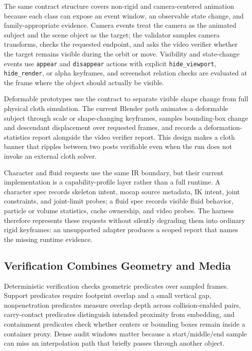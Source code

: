 \documentclass{article}
\newcommand{\code}[1]{\texttt{#1}}
\begin{document}
The same contract structure covers non-rigid and camera-centered animation because each class can expose an event window, an observable state change, and family-appropriate evidence. Camera events treat the camera as the animated subject and the scene object as the target; the validator samples camera transforms, checks the requested endpoint, and asks the video verifier whether the target remains visible during the orbit or move. Visibility and state-change events use \code{appear} and \code{disappear} actions with explicit \code{hide\_viewport}, \code{hide\_render}, or alpha keyframes, and screenshot relation checks are evaluated at the frame where the object should actually be visible.

Deformable prototypes use the contract to separate visible shape change from full physical cloth simulation. The current Blender path animates a deformable subject through scale or shape-changing keyframes, samples bounding-box change and descendant displacement over requested frames, and records a deformation-statistics report alongside the video verifier report. This design makes a cloth banner that ripples between two posts verifiable even when the run does not invoke an external cloth solver.

Character and fluid requests use the same IR boundary, but their current implementation is a capability-profile layer rather than a full runtime. A character spec records skeleton intent, mocap source metadata, IK intent, joint constraints, and joint-limit probes; a fluid spec records visible fluid behavior, particle or volume statistics, cache ownership, and video probes. The harness therefore represents these requests without silently degrading them into ordinary rigid keyframes: an unsupported adapter produces a scoped report that names the missing runtime evidence.

\subsection{Verification Combines Geometry and Media}

Deterministic verification checks geometric predicates over sampled frames. Support predicates require footprint overlap and a small vertical gap, nonpenetration predicates measure overlap depth across collision-enabled pairs, carry-contact predicates distinguish intended proximity from embedding, and containment predicates check whether centers or bounding boxes remain inside a container proxy. Dense audit windows matter because a start/middle/end sample can miss an interpolation path that briefly passes through another object.
\end{document}
